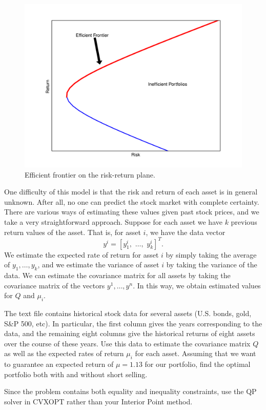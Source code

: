 \begin{figure}
\centering
\includegraphics[width=\textwidth]{frontier.pdf}
\caption{Efficient frontier on the risk-return plane.}
\label{fig:frontier}
\end{figure}

One difficulty of this model is that the risk and return of each asset is in general unknown. After all, no one can predict the stock
market with complete certainty. There are various ways of estimating these values given past stock prices, and we take a very straightforward
approach. Suppose for each asset we have $k$ previous return values of the asset. That is, for asset $i$, we have the data vector
\[
y^i = [y^i_1,\,\, \ldots, \,\,y^i_k]^T.
\]
We estimate the expected rate of return for asset $i$ by simply taking the average of $y_1,\ldots,y_k$, and we estimate the variance
of asset $i$ by taking the variance of the data. We can estimate the covariance matrix for all assets by taking the covariance matrix of the
vectors $y^1,\ldots,y^n$. In this way, we obtain estimated values for $Q$ and $\mu_i$.

\begin{problem}
The text file  contains historical stock data for several assets (U.S. bonds, gold, S\&P 500, etc).
In particular, the first column gives the years corresponding to the data, and the remaining eight columns give the historical returns
of eight assets over the course of these years. Use this data to estimate the covariance matrix $Q$ as well as the expected rates
of return $\mu_i$ for each asset. Assuming that we want to guarantee an expected return of $\mu = 1.13$ for our portfolio,
find the optimal portfolio both with and without short selling.

Since the problem contains both equality and inequality constraints, use the QP solver in CVXOPT rather than your Interior Point method.

\end{problem} 